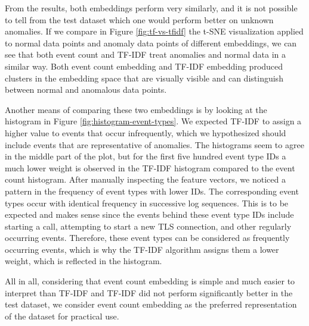 From the results, both embeddings perform very similarly, and it is not possible to tell from the test dataset which one would perform better on unknown anomalies. If we compare in Figure \ref{fig:tf-vs-tfidf} the t-SNE visualization applied to normal data points and anomaly data points of different embeddings, we can see that both event count and TF-IDF treat anomalies and normal data in a similar way. Both event count embedding and TF-IDF embedding produced clusters in the embedding space that are visually visible and can distinguish between normal and anomalous data points.

Another means of comparing these two embeddings is by looking at the histogram in Figure \ref{fig:histogram-event-types}. We expected TF-IDF to assign a higher value to events that occur infrequently, which we hypothesized should include events that are representative of anomalies. The histograms seem to agree in the middle part of the plot, but for the first five hundred event type IDs a much lower weight is observed in the TF-IDF histogram compared to the event count histogram. After manually inspecting the feature vectors, we noticed a pattern in the frequency of event types with lower IDs. The corresponding event types occur with identical frequency in successive log sequences. This is to be expected and makes sense since the events behind these event type IDs include starting a call, attempting to start a new TLS connection, and other regularly occurring events. Therefore, these event types can be considered as frequently occurring events, which is why the TF-IDF algorithm assigns them a lower weight, which is reflected in the histogram.

All in all, considering that event count embedding is simple and much easier to interpret than TF-IDF and TF-IDF did not perform significantly better in the test dataset, we consider event count embedding as the preferred representation of the dataset for practical use.




